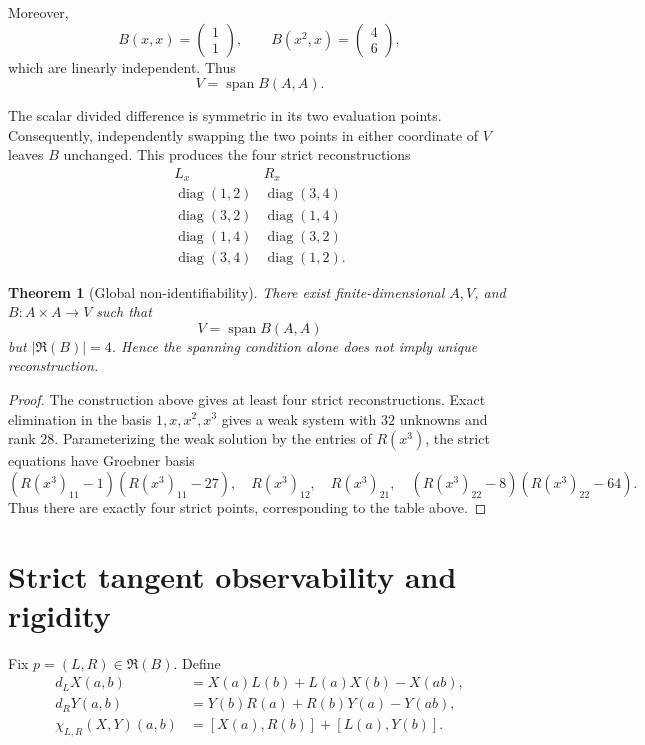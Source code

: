 \documentclass[11pt]{amsart}
\newtheorem{theorem}{Theorem}[section]
\newcommand{\Span}{\operatorname{span}}
\newcommand{\Rfib}{\mathfrak R}
\begin{document}
Moreover,
\[
B(x,x)=\begin{pmatrix}1\\1\end{pmatrix},
\qquad
B(x^2,x)=\begin{pmatrix}4\\6\end{pmatrix},
\]
which are linearly independent.  Thus
\[
V=\Span B(A,A).
\]

The scalar divided difference is symmetric in its two evaluation points.  Consequently, independently swapping the two points in either coordinate of $V$ leaves $B$ unchanged.  This produces the four strict reconstructions
\[
\begin{array}{c|c}
L_x&R_x\\ \hline
\operatorname{diag}(1,2)&\operatorname{diag}(3,4)\\
\operatorname{diag}(3,2)&\operatorname{diag}(1,4)\\
\operatorname{diag}(1,4)&\operatorname{diag}(3,2)\\
\operatorname{diag}(3,4)&\operatorname{diag}(1,2).
\end{array}
\]

\begin{theorem}[Global non-identifiability]\label{thm:four-points}
There exist finite-dimensional $A,V$, and $B:A\times A\to V$ such that
\[
V=\Span B(A,A)
\]
but $|\Rfib(B)|=4$.  Hence the spanning condition alone does not imply unique reconstruction.
\end{theorem}

\begin{proof}
The construction above gives at least four strict reconstructions.  Exact elimination in the basis $1,x,x^2,x^3$ gives a weak system with $32$ unknowns and rank $28$.  Parameterizing the weak solution by the entries of $R(x^3)$, the strict equations have Groebner basis
\[
(R(x^3)_{11}-1)(R(x^3)_{11}-27),\quad
R(x^3)_{12},\quad R(x^3)_{21},\quad
(R(x^3)_{22}-8)(R(x^3)_{22}-64).
\]
Thus there are exactly four strict points, corresponding to the table above.
\end{proof}

\section{Strict tangent observability and rigidity}

Fix $p=(L,R)\in\Rfib(B)$.  Define
\begin{align*}
d_LX(a,b)&=X(a)L(b)+L(a)X(b)-X(ab),\\
d_RY(a,b)&=Y(b)R(a)+R(b)Y(a)-Y(ab),\\
\chi_{L,R}(X,Y)(a,b)&=[X(a),R(b)]+[L(a),Y(b)].
\end{align*}
\end{document}
